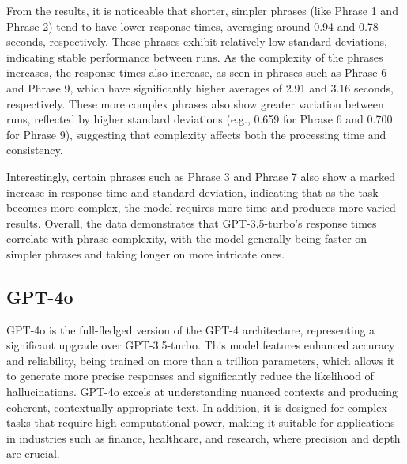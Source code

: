 From the results, it is noticeable that shorter, simpler phrases (like Phrase 1 and Phrase 2) tend to have lower response times, averaging around 0.94 and 0.78 seconds, respectively. These phrases exhibit relatively low standard deviations, indicating stable performance between runs. As the complexity of the phrases increases, the response times also increase, as seen in phrases such as Phrase 6 and Phrase 9, which have significantly higher averages of 2.91 and 3.16 seconds, respectively. These more complex phrases also show greater variation between runs, reflected by higher standard deviations (e.g., 0.659 for Phrase 6 and 0.700 for Phrase 9), suggesting that complexity affects both the processing time and consistency.

Interestingly, certain phrases such as Phrase 3 and Phrase 7 also show a marked increase in response time and standard deviation, indicating that as the task becomes more complex, the model requires more time and produces more varied results. Overall, the data demonstrates that GPT-3.5-turbo's response times correlate with phrase complexity, with the model generally being faster on simpler phrases and taking longer on more intricate ones.

\subsection{GPT-4o}

GPT-4o is the full-fledged version of the GPT-4 architecture, representing a significant upgrade over GPT-3.5-turbo. This model features enhanced accuracy and reliability, being trained on more than a trillion parameters, which allows it to generate more precise responses and significantly reduce the likelihood of hallucinations. GPT-4o excels at understanding nuanced contexts and producing coherent, contextually appropriate text. In addition, it is designed for complex tasks that require high computational power, making it suitable for applications in industries such as finance, healthcare, and research, where precision and depth are crucial.

